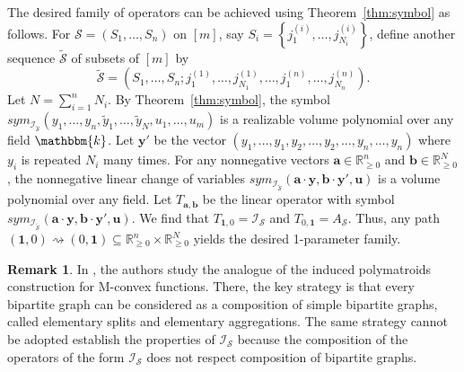 \documentclass{amsart}
\newcommand{\RR}{\mathbb R}
\newcommand{\kk}{\mathbbm{k}}
\theoremstyle{plain}
\theoremstyle{definition}
\newtheorem{rem}[thm]{Remark}
\begin{document}
The desired family of operators can be achieved using Theorem~\ref{thm:symbol} as follows.
For $\mathcal{S}=(S_1,\ldots,S_n)$ on $[m]$, say $S_i=\left\{j_1^{(i)},\ldots,j_{N_i}^{(i)}\right\}$, define another sequence $\widetilde{\mathcal S}$ of subsets of $[m]$ by
$$\widetilde{\mathcal{S}}=(S_1,\ldots,S_n;j_1^{(1)},\ldots,j_{N_1}^{(1)},\ldots,j_1^{(n)},\ldots,j_{N_n}^{(n)}).$$
Let $N = \sum_{i = 1}^nN_i$.  By Theorem~\ref{thm:symbol}, the symbol $sym_{\mathcal I_{\widetilde{\mathcal S}}}(y_1, \dotsc, y_n, \widetilde y_1, \dotsc, \widetilde y_N, u_1, \dotsc, u_m)$ is a realizable volume polynomial over any field $\kk$.
Let $\boldsymbol y'$ be the vector $(y_1, \dotsc, y_1, y_2, \dotsc, y_2, \dotsc, y_n, \dotsc, y_n)$ where $y_i$ is repeated $N_i$ many times.
For any nonnegative vectors $\boldsymbol a\in \RR^n_{\geq 0}$ and $\boldsymbol b\in \RR_{\geq 0}^N$, the nonnegative linear change of variables $sym_{\mathcal I_{\widetilde{\mathcal S}}}(\boldsymbol a \cdot \boldsymbol y, \boldsymbol b \cdot \boldsymbol{ y'}, \boldsymbol u)$ is a volume polynomial over any field.  Let $T_{\boldsymbol a, \boldsymbol b}$ be the linear operator with symbol $sym_{\mathcal I_{\widetilde{\mathcal S}}}(\boldsymbol a \cdot \boldsymbol y, \boldsymbol b \cdot \boldsymbol{ y'}, \boldsymbol u)$. We find that $T_{\mathbf 1,0} = \mathcal I_{\mathcal S}$ and $T_{0,\mathbf 1} = A_{\mathcal S}$.  Thus, any path $(\mathbf{1},0)\rightsquigarrow(0,\mathbf{1})\subseteq \RR_{\geq 0}^n\times \RR_{\geq 0}^{N}$ yields the desired 1-parameter family.


\begin{rem}
In \cite{KMT}, the authors study the analogue of the induced polymatroids construction for M-convex functions.  There, the key strategy is that every bipartite graph can be considered as a composition of simple bipartite graphs, called elementary splits and elementary aggregations.  The same strategy cannot be adopted establish the properties of $\mathcal I_{\mathcal S}$ because the composition of the operators of the form $\mathcal I_{\mathcal S}$ does not respect composition of bipartite graphs.
\end{rem}

{\fontsize{10.5}{11}\selectfont 
    }
\end{document}
